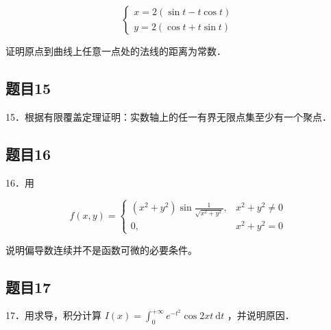 \documentclass{article}
\begin{document}
\[
\left\{\begin{array}{l}
x=2(\sin t-t \cos t) \\
y=2(\cos t+t \sin t)
\end{array}\right.
\]

证明原点到曲线上任意一点处的法线的距离为常数．

\subsection{题目15}
15．根据有限覆盖定理证明：实数轴上的任一有界无限点集至少有一个聚点．

\subsection{题目16}
16．用

\[
f(x, y)= \begin{cases}\left(x^{2}+y^{2}\right) \sin \frac{1}{\sqrt{x^{2}+y^{2}}}, & x^{2}+y^{2} \neq 0 \\ 0, & x^{2}+y^{2}=0\end{cases}
\]

说明偏导数连续并不是函数可微的必要条件。

\subsection{题目17}
17．用求导，积分计算 \(I(x)=\int_{0}^{+\infty} e^{-t^{2}} \cos 2 x t \mathrm{~d} t\) ，并说明原因．
\end{document}
